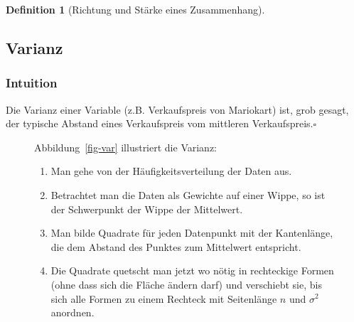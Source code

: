 \documentclass[
  a4paper,
  DIV=11]{scrreprt}
\providecommand{\tightlist}{%
  \setlength{\itemsep}{0pt}\setlength{\parskip}{0pt}}\usepackage{longtable,booktabs,array}
\theoremstyle{definition}
\theoremstyle{definition}
\theoremstyle{definition}
\newtheorem{definition}{Definition}[chapter]
\theoremstyle{remark}
\begin{document}
\begin{definition}[Richtung und Stärke eines
Zusammenhang]
\subsection{Varianz}\label{varianz}

\subsubsection{Intuition}\label{intuition}

\begin{tcolorbox}[enhanced jigsaw, leftrule=.75mm, opacitybacktitle=0.6, colback=white, colframe=quarto-callout-note-color-frame, coltitle=black, colbacktitle=quarto-callout-note-color!10!white, opacityback=0, left=2mm, breakable, titlerule=0mm, toptitle=1mm, bottomtitle=1mm, rightrule=.15mm, title=\textcolor{quarto-callout-note-color}{\faInfo}\hspace{0.5em}{Hinweis}, arc=.35mm, bottomrule=.15mm, toprule=.15mm]

Die Varianz einer Variable (z.B. Verkaufspreis von Mariokart) ist, grob
gesagt, der typische Abstand eines Verkaufspreis vom mittleren
Verkaufspreis.\(\square\)

\end{tcolorbox}

\begin{figure}

\begin{minipage}{0.50\linewidth}
Abbildung~\ref{fig-var} illustriert die Varianz:

\begin{enumerate}
\def\labelenumi{\arabic{enumi}.}
\tightlist
\item
  Man gehe von der Häufigkeitsverteilung der Daten aus.
\item
  Betrachtet man die Daten als Gewichte auf einer Wippe, so ist der
  Schwerpunkt der Wippe der Mittelwert.
\item
  Man bilde Quadrate für jeden Datenpunkt mit der Kantenlänge, die dem
  Abstand des Punktes zum Mittelwert entspricht.
\item
  Die Quadrate quetscht man jetzt wo nötig in rechteckige Formen (ohne
  dass sich die Fläche ändern darf) und verschiebt sie, bis sich alle
  Formen zu einem Rechteck mit Seitenlänge \(n\) und \(\sigma^2\)
  anordnen.
\end{enumerate}

\end{minipage}%
%
\begin{minipage}{0.50\linewidth}


\end{minipage}
\end{figure}
\end{definition}
\end{document}
